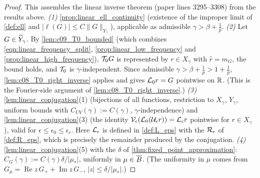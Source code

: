 \begin{proof}
  This assembles the linear inverse theorem (paper lines 3295--3308) from the results above.
  \emph{(1)} \cref{prop:linear_ell_continuity} (existence of the improper limit of \cref{def:ell} and $|\ell(G)|\le C\|G\|_{Y_\gamma}$), applicable as
  admissible $\gamma>\beta+\frac1p$.
  \emph{(2)} Let $G\in\widetilde{Y}_\gamma$. By \cref{lem:c09_T0_bounded} (which combines \eqref{eqn:linear_frequency_split}, \cref{prop:linear_low_frequency} and
  \cref{prop:linear_high_frequency}), $\mathcal{T}_0G$ is represented by $r\in X_\gamma$ with $\widehat r=m_G$, the bound holds, and $\mathcal{T}_0$ is $\gamma$-independent.
  Since admissible $\gamma>\beta+\frac1p>1+\frac1p$, \cref{lem:c08_T0_right_inverse} applies and gives $\mathcal{L}_0r=G$ pointwise on $\mathbb{R}$.
  (This is the Fourier-side argument of \cref{lem:c08_T0_right_inverse}.)
  \emph{(3)} \cref{lem:linear_conjugation}(1) (bijections of all functions, restriction to $X_\gamma$, $Y_\gamma$, uniform bounds with $C_{UV}(\gamma):=C(\gamma)$,
  $\gamma$-independence) and \cref{lem:linear_conjugation}(3) (the identity $\mathcal{V}_\epsilon(\mathcal{L}_0(\mathcal{U}_\epsilon r))=\mathcal{L}_\epsilon r$ pointwise for $r\in X_\gamma$), valid for
  $\epsilon\le\epsilon_0\le\epsilon_c$. Here $\mathcal{L}_\epsilon$ is defined in \cref{def:L_eps} with the $\mathcal{R}_\epsilon$ of \cref{def:R_eps}, which is precisely the
  remainder produced by the conjugation.
  \emph{(4)} \cref{lem:linear_conjugation}(5) with the $\delta$ of \cref{thm:fixed_point_approximation}: $C_G(\gamma):=C(\gamma)\delta/|\mu_*|$, uniformly in $\mu\in\overline{B}$.
  (The uniformity in $\mu$ comes from $G_\mu=\operatorname{Re}z\,G_++\operatorname{Im}z\,G_-$, $|z|\le\delta/|\mu_*|$.)
\end{proof}
